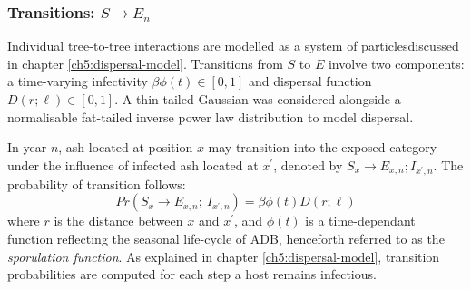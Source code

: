 \subsubsection{Transitions: $S\rightarrow E_n$}

Individual tree-to-tree interactions are modelled as a system of particles\textemdash discussed in chapter \ref{ch5:dispersal-model}.
Transitions from $S$ to $E$ involve two components: a time-varying infectivity $\beta\phi(t)\in [0, 1]$ and dispersal function $D(r; \ell)\in [0, 1]$.
A thin-tailed Gaussian was considered alongside a normalisable fat-tailed inverse power law distribution to model dispersal.

In year $n$, ash located at position $x$ may transition into the exposed category under the influence of infected ash located at $x^\prime$, denoted by $S_x \rightarrow E_{x,n}; I_{x^\prime, n}$.
The probability of transition follows:
\begin{equation}
    Pr(S_{x} \rightarrow E_{x,n} ;\ I_{x^{\prime}, n} ) = \beta  \phi(t) D(r;\ell)
\end{equation}
where $r$ is the distance between $x$ and $x^{\prime}$, and $\phi(t)$ is a time-dependant function reflecting the seasonal life-cycle of ADB, henceforth referred to as the \textit{sporulation function}.
As explained in chapter \ref{ch5:dispersal-model}, transition probabilities are computed for each step a host remains infectious.

